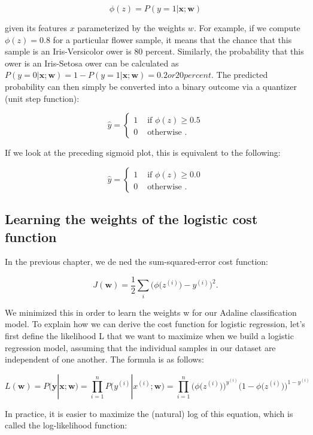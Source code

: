 \documentclass[letterpaper]{report}
\begin{document}
\[
\phi(z) = P(y=1 | \mathbf{x}; \mathbf{w})
\]

given its features $x$ parameterized by the weights $w$. For example, if we compute $\phi(z) = 0.8$ for a particular flower sample, it means that the chance that this sample is an Iris-Versicolor  ower is 80 percent. Similarly, the probability that this  ower is an Iris-Setosa  ower can be calculated as $P(y=0 | \mathbf{x};\mathbf{w})=1 - P (y=1 | \mathbf{x}; \mathbf{w}) = 0.2 or 20 percent.$ The predicted probability can then simply be converted into a binary outcome via a quantizer (unit step function):

\[ \hat{y}= \begin{cases} 
      1 & \text{ if } \phi(z) \ge 0.5 \\
      0 & \text{ otherwise }.
   \end{cases}
\]

If we look at the preceding sigmoid plot, this is equivalent to the following:

\[ \hat{y}= \begin{cases} 
      1 & \text{ if } \phi(z) \ge 0.0 \\
      0 & \text{ otherwise }.
   \end{cases}
\]

\subsection{Learning the weights of the logistic cost function}

In the previous chapter, we de ned the sum-squared-error cost function: 

\[
J(\mathbf{w}) = \frac{1}{2} \sum_i \bigg( \phi \big( z^{(i)} \big) - y^{(i)}  \bigg)^2.
\]

We minimized this in order to learn the weights w for our Adaline classification model. To explain how we can derive the cost function for logistic regression, let's  first define the likelihood L that we want to maximize when we build a logistic regression model, assuming that the individual samples in our dataset are independent of one another. The formula is as follows:

\[
L(\mathbf{w}) = P(\mathbf{y} | \mathbf{x}; \mathbf{w}) = \prod_{i=1}^{n} P \big( y^{(i)} | x^{(i)}; \mathbf{w} \big) =  \prod_{i=1}^{n} \bigg( \phi \big(z^{(i)} \big) \bigg) ^ {y^{(i)}} \bigg( 1 - \phi \big( z^{(i)} \big) \bigg)^{1-y^{(i)}}
\]

In practice, it is easier to maximize the (natural) log of this equation, which is called
the log-likelihood function:
\end{document}
